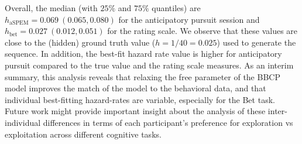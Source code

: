 \documentclass[10pt,letterpaper]{article}
\newcommand{\citep}[1]{\cite{#1}}
\newcommand{\LP}[1]{\textbf{\textcolor{red}{[LP: #1]}}}
\newcommand{\CP}[1]{\textbf{\textcolor{green}{[CP: #1]}}}
\begin{document}
Overall, the median (with $25\%$ and $75\%$ quantiles) are $h_{\text{aSPEM}} = 0.069 ~ (0.065, 0.080)$ %
for the anticipatory pursuit session and
$h_{\text{bet}} = 0.027 ~ (0.012, 0.051)$ %
for the rating scale.
We observe that these values are close to the (hidden) ground truth value ($h=1/40=0.025$) used to generate the sequence.
In addition, the best-fit hazard rate value is higher for anticipatory pursuit compared to the true value and the rating scale measures.
As an interim summary, this analysis reveals
that relaxing the free parameter of the BBCP model
improves the match of the model to the behavioral data, and that individual best-fitting hazard-rates are variable, especially for the Bet task.
Future work might provide important insight about the analysis of these inter-individual differences in terms of each participant's preference for exploration vs exploitation across different cognitive tasks.
\end{document}
